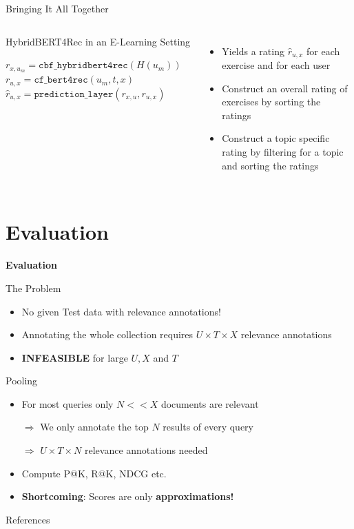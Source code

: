 \documentclass[en]{sdqbeamer}
\begin{document}
\begin{frame}{Bringing It All Together}
	\begin{columns}
		\begin{algorithm}[H]
			\caption{HybridBERT4Rec in an E-Learning Setting}
			\begin{algorithmic}[1]
					\State $r_{x,u_m} = \texttt{cbf\_hybridbert4rec}(H(u_m))$
						\State $r_{u, x} = \texttt{cf\_bert4rec}(u_m,t,x)$
						\State $\hat{r}_{u,x} = \texttt{prediction\_layer}(r_{x,u}, r_{u,x})$
					\EndFor
				\EndFor
			\end{algorithmic}
		\end{algorithm}
		\begin{itemize}
			\item Yields a rating $\hat{r}_{u,x}$ for each exercise and for each user
			\item Construct an overall rating of exercises by sorting the ratings
			\item Construct a topic specific rating by filtering for a topic and sorting the ratings
		\end{itemize}
	\end{columns}
\end{frame}

\section{Evaluation}
\begin{frame}
	\centering\textbf{\LARGE{Evaluation}}
\end{frame}
\begin{frame}{The Problem}
	\begin{itemize}
		\item No given Test data with relevance annotations!
		\item Annotating the whole collection requires $U \times T \times X$ relevance annotations
		\item \textbf{INFEASIBLE} for large $U, X$ and $T$
	\end{itemize}
\end{frame}
\begin{frame}{Pooling \cite{suarezInformationRetrievalWeb2022}}
	\begin{itemize}
		\item For most queries only $N << X$ documents are relevant
		\item[$\Rightarrow$] We only annotate the top $N$ results of every query
		\item[$\Rightarrow$] $U \times T \times N$ relevance annotations needed
		\item Compute P@K, R@K, NDCG etc.
		\item \textbf{Shortcoming}: Scores are only \textbf{approximations!}
	\end{itemize}
\end{frame}

\appendix
\beginbackup
\begin{frame}{References}
	\printbibliography
\end{frame}

\backupend
\end{document}
